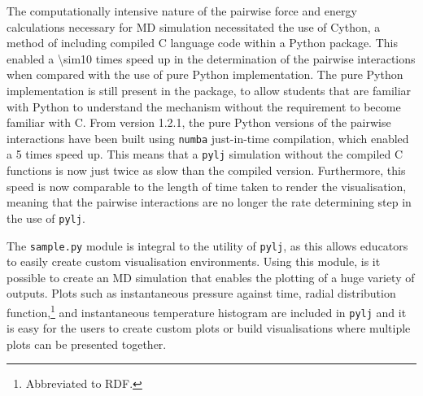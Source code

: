The computationally intensive nature of the pairwise force and energy calculations necessary for MD simulation necessitated the use of Cython, a method of including compiled C language code within a Python package.\autocite{noauthor_cython_nodate}
This enabled a \num{\sim10} times speed up in the determination of the pairwise interactions when compared with the use of pure Python implementation.
The pure Python implementation is still present in the package, to allow students that are familiar with Python to understand the mechanism without the requirement to become familiar with C.
From version 1.2.1,\autocite{mccluskey_arm61/pylj_2019-1} the pure Python versions of the pairwise interactions have been built using \texttt{numba} just-in-time compilation,\autocite{noauthor_numba_nodate} which enabled a \num{5} times speed up.
This means that a \texttt{pylj} simulation without the compiled C functions is now just twice as slow than the compiled version.
Furthermore, this speed is now comparable to the length of time taken to render the visualisation, meaning that the pairwise interactions are no longer the rate determining step in the use of \texttt{pylj}.

The \texttt{sample.py} module is integral to the utility of \texttt{pylj}, as this allows educators to easily create custom visualisation environments.
Using this module, is it possible to create an MD simulation that enables the plotting of a huge variety of outputs.
Plots such as instantaneous pressure against time, radial distribution function,\footnote{Abbreviated to RDF.}  and instantaneous temperature histogram are included in \texttt{pylj} and it is easy for the users to create custom plots or build visualisations where multiple plots can be presented together.

